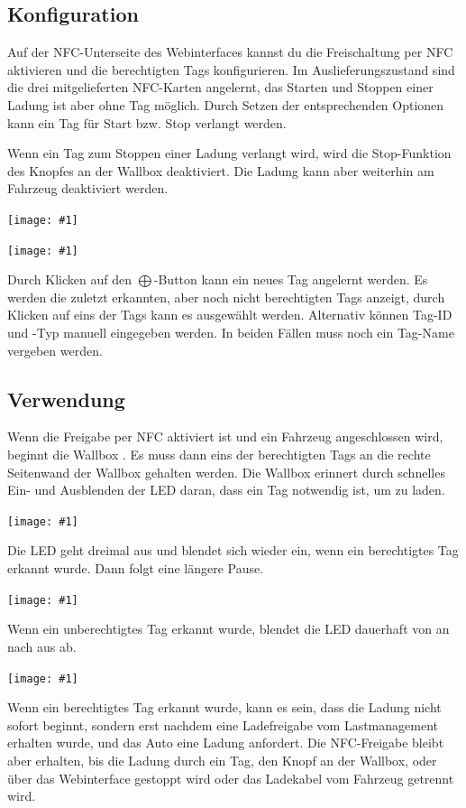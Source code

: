 \documentclass[a4paper,10pt]{article}
\newcommand{\hint}[1]{\begin{tcolorbox}[colback=boxgray,colframe=black,coltext=
white,title=Hinweis]#1\end{tcolorbox}}
\newcommand{\gfx}[1]{\texttt{[image: \#1]}}
\begin{document}
\begin{multicols*}{2}
	\subsection{Konfiguration}
	Auf der NFC-Unterseite des Webinterfaces kannst du die Freischaltung per NFC aktivieren
	und die berechtigten Tags konfigurieren. Im Auslieferungszustand sind die
	drei mitgelieferten NFC-Karten angelernt, das Starten und Stoppen einer Ladung ist aber ohne Tag möglich.
	Durch Setzen der entsprechenden Optionen kann ein Tag für Start bzw. Stop verlangt werden.
	\hint{Wenn ein Tag zum Stoppen einer Ladung verlangt wird,
	wird die Stop-Funktion des Knopfes an der Wallbox deaktiviert.
	Die Ladung kann aber weiterhin am Fahrzeug deaktiviert werden.}

	\gfx{./img_warp2/resized/web_nfc}

	\gfx{./img_warp2/resized/web_nfc_new}

	Durch Klicken auf den $\bigoplus$-Button kann ein neues Tag angelernt werden.
	Es werden die zuletzt erkannten, aber noch nicht berechtigten Tags anzeigt,
	durch Klicken auf eins der Tags kann es ausgewählt werden. Alternativ können
	Tag-ID und -Typ manuell eingegeben werden. In beiden Fällen muss noch ein Tag-Name vergeben werden.

	\subsection{Verwendung}
	Wenn die Freigabe per NFC aktiviert ist und ein Fahrzeug angeschlossen wird,
	beginnt die Wallbox . Es muss dann eins der berechtigten Tags an die rechte
	Seitenwand der Wallbox gehalten werden. Die Wallbox erinnert durch schnelles
	Ein- und Ausblenden der LED daran, dass ein Tag notwendig ist, um zu laden.

	\gfx{./img_warp2/resized/blink_nag}

	Die LED geht dreimal aus und blendet sich wieder ein, wenn ein berechtigtes Tag
	erkannt wurde. Dann folgt eine längere Pause.

	\gfx{./img_warp2/resized/blink_ack}

	Wenn ein unberechtigtes Tag erkannt wurde, blendet die LED dauerhaft von an nach aus ab.

	\gfx{./img_warp2/resized/blink_nack}

	Wenn ein berechtigtes Tag erkannt wurde, kann es sein, dass die Ladung nicht
	sofort beginnt, sondern erst nachdem eine Ladefreigabe vom Lastmanagement erhalten wurde,
	und das Auto eine Ladung anfordert. Die NFC-Freigabe bleibt aber erhalten,
	bis die Ladung durch ein Tag, den Knopf an der Wallbox, oder über das Webinterface gestoppt wird
	oder das Ladekabel vom Fahrzeug getrennt wird.


\end{multicols*}
\end{document}
